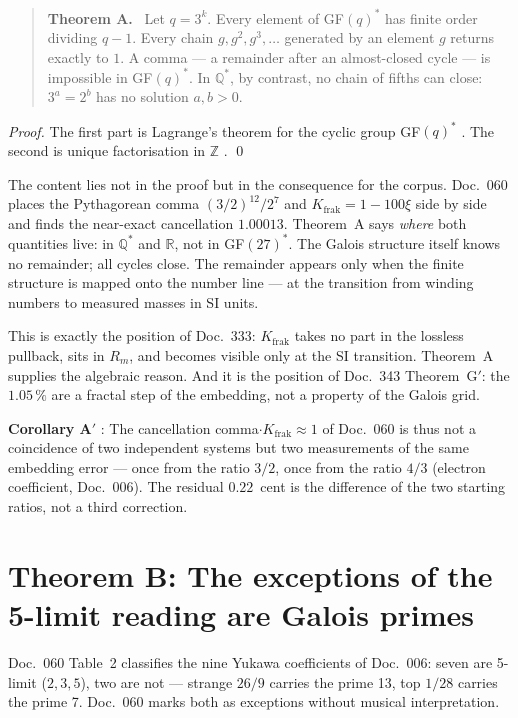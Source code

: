 \begin{quote}
\textbf{Theorem A.} \BM\ Let $q=3^k$. Every element of GF$(q)^*$ has
finite order dividing $q-1$. Every chain $g, g^2, g^3,\dots$ generated by
an element $g$ returns exactly to $1$. A comma --- a remainder after an
almost-closed cycle --- is impossible in GF$(q)^*$. In $\mathbb{Q}^*$,
by contrast, no chain of fifths can close: $3^a=2^b$ has no solution
$a,b>0$.
\end{quote}

\emph{Proof.} The first part is Lagrange's theorem for the cyclic group
GF$(q)^*$ \EM. The second is unique factorisation in $\mathbb{Z}$ \EM. \qed

The content lies not in the proof but in the consequence for the corpus.
Doc.~060 places the Pythagorean comma $(3/2)^{12}/2^7$ and
$K_\text{frak}=1-100\xi$ side by side and finds the near-exact
cancellation $1.00013$. Theorem~A says \emph{where} both quantities live:
in $\mathbb{Q}^*$ and $\mathbb{R}$, not in GF$(27)^*$. The Galois structure
itself knows no remainder; all cycles close. The remainder appears only
when the finite structure is mapped onto the number line --- at the
transition from winding numbers to measured masses in SI units.

This is exactly the position of Doc.~333: $K_\text{frak}$ takes no part
in the lossless pullback, sits in $R_m$, and becomes visible only at the
SI transition. Theorem~A supplies the algebraic reason. And it is the
position of Doc.~343 Theorem~G$'$: the $1.05\,\%$ are a fractal step of
the embedding, not a property of the Galois grid.

\textbf{Corollary A$'$} \KM: The cancellation comma$\cdot K_\text{frak}\approx1$
of Doc.~060 is thus not a coincidence of two independent systems but two
measurements of the same embedding error --- once from the ratio $3/2$,
once from the ratio $4/3$ (electron coefficient, Doc.~006). The residual
$0.22$~cent is the difference of the two starting ratios, not a third
correction.

\section{Theorem B: The exceptions of the 5-limit reading are Galois primes}

Doc.~060 Table~2 classifies the nine Yukawa coefficients of Doc.~006:
seven are 5-limit ($2,3,5$), two are not --- strange $26/9$ carries the
prime 13, top $1/28$ carries the prime 7. Doc.~060 marks both as exceptions
without musical interpretation.

